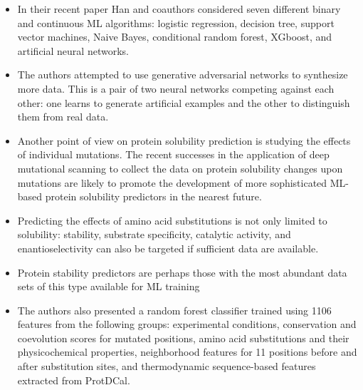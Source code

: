 \documentclass[12pt]{article}
\newtheorem{Note}{Nota}%
\begin{document}
\begin{itemize}
\begin{Note}
Data from the label-free mass spectroscopy-based assay of 91 substrates and 54 enzymes derived from the plant Arabidopsis thaliana were used for functional prediction. The authors trained sequence-based decision trees, systematically varying combinations of physicochemical properties, e.g. log P, molecular area, and number/type of nucleophilic groups, and structural information, e.g. scaﬀold type and functional groups. The resulting predictor was successfully tested on four individually selected gene sequences as well as two complete families of enzymes from four diﬀerent organisms, which highlights the tremendous potential of training ML predictors on the newly acquired data from high-throughput data collection methods. 
\end{Note}

\item In their recent paper \cite{35} Han and coauthors considered seven diﬀerent binary and continuous ML algorithms: logistic regression, decision tree, support vector machines, Naive Bayes, conditional random forest, XGboost, and artiﬁcial neural networks. 

\item The authors attempted to use generative adversarial networks to synthesize more data. This is a pair of two neural networks competing against each other: one learns to generate artiﬁcial examples and the other to distinguish them from real data. 

\item Another point of view on protein solubility prediction is studying the eﬀects of individual mutations. The recent successes in the application of deep mutational scanning to collect the data on protein solubility changes upon mutations\cite{68} are likely to promote the development of more sophisticated ML-based protein solubility predictors in the nearest future. 

\item Predicting the eﬀects of amino acid substitutions is not only limited to solubility: stability, substrate speciﬁcity, catalytic activity, and enantioselectivity can also be targeted if suﬃcient data are available.

\item Protein stability predictors are perhaps those with the most abundant data sets of this type available for ML training

\item The authors also presented a random forest classiﬁer trained using 1106 features from the following groups: experimental conditions, conservation and coevolution scores for mutated positions, amino acid substitutions and their physicochemical properties, neighborhood features for 11 positions before and after substitution sites, and thermodynamic sequence-based features extracted from ProtDCal\cite{69}. 


\end{itemize}
\end{document}
